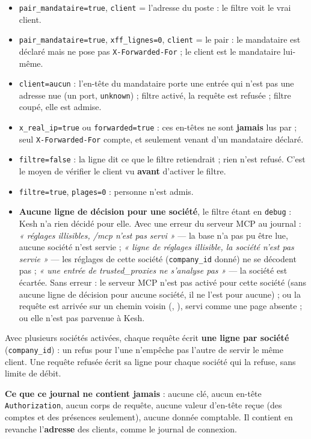 \documentclass[a4paper,11pt,oneside]{article}
\begin{document}
\begin{itemize}
    \item \texttt{pair\_mandataire=true}, \texttt{client} = l'adresse du poste : le filtre voit le vrai client.
    \item \texttt{pair\_mandataire=true}, \texttt{xff\_lignes=0}, \texttt{client} = le pair : le mandataire est déclaré mais ne pose pas \texttt{X-Forwarded-For} ; le client est le mandataire lui-même.
    \item \texttt{client=aucun} : l'en-tête du mandataire porte une entrée qui n'est pas une adresse nue (un port, \texttt{unknown}) ; filtre activé, la requête est refusée ; filtre coupé, elle est admise.
    \item \texttt{x\_real\_ip=true} ou \texttt{forwarded=true} : ces en-têtes ne sont \textbf{jamais} lus par  ; seul \texttt{X-Forwarded-For} compte, et seulement venant d'un mandataire déclaré.
    \item \texttt{filtre=false} : la ligne dit ce que le filtre retiendrait ; rien n'est refusé. C'est le moyen de vérifier le client vu \textbf{avant} d'activer le filtre.
    \item \texttt{filtre=true}, \texttt{plages=0} : personne n'est admis.
    \item \textbf{Aucune ligne de décision pour une société}, le filtre étant en \texttt{debug} : Kesh n'a rien décidé pour elle. Avec une erreur du serveur MCP au journal : \emph{« réglages illisibles, /mcp n'est pas servi »} --- la base n'a pas pu être lue, aucune société n'est servie ; \emph{« ligne de réglages illisible, la société n'est pas servie »} --- les réglages de cette société (\texttt{company\_id} donné) ne se décodent pas ; \emph{« une entrée de trusted\_proxies ne s'analyse pas »} --- la société est écartée. Sans erreur : le serveur MCP n'est pas activé pour cette société (sans aucune ligne de décision pour aucune société, il ne l'est pour aucune) ; ou la requête est arrivée sur un chemin voisin (, ), servi comme une page absente ; ou elle n'est pas parvenue à Kesh.
\end{itemize}

Avec plusieurs sociétés activées, chaque requête écrit \textbf{une ligne par société} (\texttt{company\_id}) : un refus pour l'une n'empêche pas l'autre de servir le même client. Une requête refusée écrit sa ligne pour chaque société qui la refuse, sans limite de débit.

\textbf{Ce que ce journal ne contient jamais} : aucune clé, aucun en-tête \texttt{Authorization}, aucun corps de requête, aucune valeur d'en-tête reçue (des comptes et des présences seulement), aucune donnée comptable. Il contient en revanche l'\textbf{adresse} des clients, comme le journal de connexion.
\end{document}
